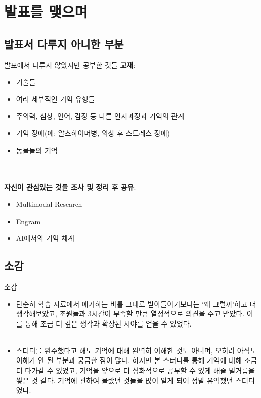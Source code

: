 \documentclass{beamer}
\begin{document}
\section{발표를 맺으며}
\subsection{발표서 다루지 아니한 부분}
\begin{frame}{발표에서 다루지 않았지만 공부한 것들}
  \large
  \textbf{교재}:
  \begin{itemize}
    \item 기술들
    \item 여러 세부적인 기억 유형들
    \item 주의력, 심상, 언어, 감정 등 다른 인지과정과 기억의 관계
    \item 기억 장애(예: 알츠하이머병, 외상 후 스트레스 장애)
    \item 동물들의 기억
  \end{itemize}\\~\\

  \textbf{자신이 관심있는 것들 조사 및 정리 후 공유}:
  \begin{itemize}
    \item Multimodal Research
    \item Engram
    \item AI에서의 기억 체계
  \end{itemize}
\end{frame}

\subsection{소감}
\begin{frame}{소감}
  \begin{itemize}
    \large
    \item 단순히 학습 자료에서 얘기하는 바를 그대로 받아들이기보다는 `왜 그럴까'하고 더 생각해보았고, 조원들과 3시간이 부족할 만큼 열정적으로 의견을 주고 받았다. 
      이를 통해 조금 더 깊은 생각과 확장된 시야를 얻을 수 있었다.\\~\\
    \item 스터디를 완주했다고 해도 기억에 대해 완벽히 이해한 것도 아니며, 오히려 아직도 이해가 안 된 부분과 궁금한 점이 많다. 하지만 본 스터디를 통해 기억에 대해 조금 더 다가갈 수 있었고, 기억을 앞으로 더 심화적으로 공부할 수 있게 해줄 밑거름을 쌓은 것 같다. 기억에 관하여 몰랐던 것들을 많이 알게 되어 정말 유익했던 스터디였다.
  \end{itemize}
\end{frame}
\end{document}
